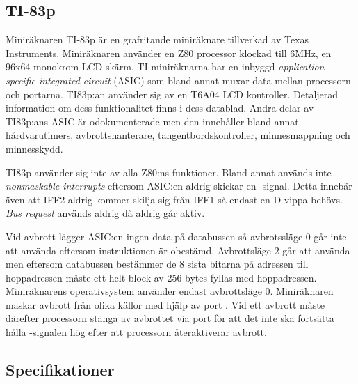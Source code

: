 \documentclass[main.tex]{subfiles}
\begin{document}
\subsection{TI-83p}
Miniräknaren TI-83p är en grafritande miniräknare tillverkad av Texas
Instruments. Miniräknaren använder en Z80 processor klockad till 6MHz, en 96x64
monokrom LCD-skärm. TI-miniräknarna har en inbyggd {\it application specific
integrated circuit} (ASIC) som bland annat muxar data mellan processorn och
portarna. TI83p:an använder sig av en T6A04 LCD kontroller. Detaljerad
information om dess funktionalitet finns i dess datablad\cite{t6a04}. Andra
delar av TI83p:ans ASIC är odokumenterade men den innehåller bland annat
hårdvarutimers, avbrottshanterare, tangentbordskontroller, minnesmappning och
minnesskydd.

TI83p använder sig inte av alla Z80:ns funktioner. Bland annat används inte
{\it nonmaskable interrupts} eftersom ASIC:en aldrig skickar en
-signal. Detta innebär även att IFF2 aldrig kommer skilja sig från
IFF1 så endast en D-vippa behövs. {\it Bus request} används aldrig då
 aldrig går aktiv.

Vid avbrott lägger ASIC:en ingen data på databussen så avbrotssläge 0 går inte
att använda eftersom instruktionen är obestämd. Avbrottsläge 2 går att använda
men eftersom databussen bestämmer de 8 sista bitarna på adressen till
hoppadressen måste ett helt block av 256 bytes fyllas med hoppadressen.
Miniräknarens operativsystem använder endast avbrottsläge 0. Miniräknaren
maskar avbrott från olika källor med hjälp av port . Vid ett avbrott
måste därefter processorn stänga av avbrottet via port  för att det
inte ska fortsätta hålla -signalen hög efter att processorn
återaktiverar avbrott.


\subsection{Specifikationer}
\cite{m45}

\clearpage
\end{document}
